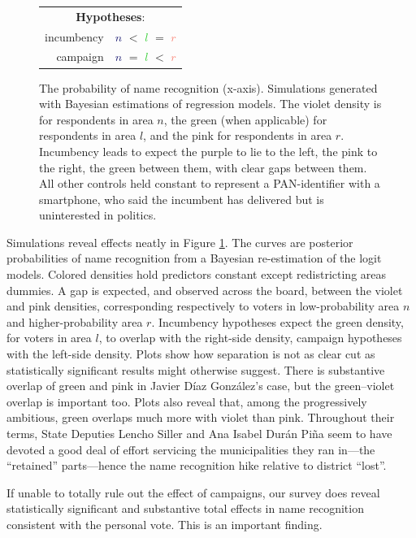 \documentclass[letter,12pt]{article}
\newcommand{\eric}[1]{\todo[color=red!15, inline]{\textbf{Eric:} #1}}
\begin{document}
\begin{figure}
\begin{tabular}{|rc|}
  \hline \multicolumn{2}{|c|}{\textbf{Hypotheses}:} \\
  incumbency & \textcolor{MidnightBlue}{$n$} $<$ \textcolor{LimeGreen}{$l$} $=$ \textcolor{Salmon}{$r$} \\
  campaign   & \textcolor{MidnightBlue}{$n$} $=$ \textcolor{LimeGreen}{$l$} $<$ \textcolor{Salmon}{$r$} \\ \hline
\end{tabular}
\caption{The probability of name recognition (x-axis). Simulations generated with Bayesian estimations of regression models. The violet density is for respondents in area $n$, the green (when applicable) for respondents in area $l$, and the pink for respondents in area $r$. Incumbency leads to expect the purple to lie to the left, the pink to the right, the green between them, with clear gaps between them. All other controls held constant to represent a PAN-identifier with a smartphone, who said the incumbent has delivered but is uninterested in politics.}\label{f:sims}
\end{figure}

Simulations reveal effects neatly in Figure \ref{f:sims}. The curves are posterior probabilities of name recognition from a Bayesian re-estimation of the logit models. Colored densities hold predictors constant except redistricting areas dummies. A gap is expected, and observed across the board, between the violet and pink densities, corresponding respectively to voters in low-probability area $n$ and higher-probability area $r$. Incumbency hypotheses expect the green density, for voters in area $l$, to overlap with the right-side density, campaign hypotheses with the left-side density. Plots show how separation is not as clear cut as statistically significant results might otherwise suggest. There is substantive overlap of green and pink in Javier Díaz González's case, but the green--violet overlap is important too. Plots also reveal that, among the progressively ambitious, green overlaps much more with violet than pink. Throughout their terms, State Deputies Lencho Siller and Ana Isabel Durán Piña seem to have devoted a good deal of effort servicing the municipalities they ran in---the ``retained'' parts---hence the name recognition hike relative to district ``lost''.

\eric{next paragraph to conclusion}

If unable to totally rule out the effect of campaigns, our survey does reveal statistically significant and substantive total effects in name recognition consistent with the personal vote. This is an important finding. 
\end{document}

